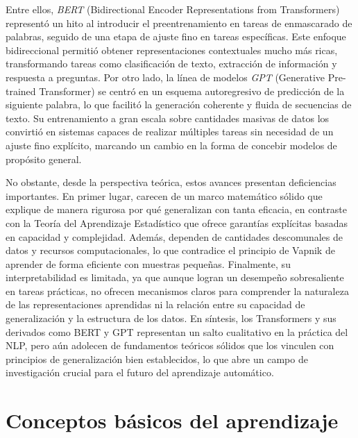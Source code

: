 \documentclass{report}
\begin{document}
Entre ellos, \textit{BERT} (Bidirectional Encoder Representations from Transformers) representó un hito al introducir el preentrenamiento en tareas de enmascarado de palabras, seguido de una etapa de ajuste fino en tareas específicas. Este enfoque bidireccional permitió obtener representaciones contextuales mucho más ricas, transformando tareas como clasificación de texto, extracción de información y respuesta a preguntas. Por otro lado, la línea de modelos \textit{GPT} (Generative Pre-trained Transformer) se centró en un esquema autoregresivo de predicción de la siguiente palabra, lo que facilitó la generación coherente y fluida de secuencias de texto. Su entrenamiento a gran escala sobre cantidades masivas de datos los convirtió en sistemas capaces de realizar múltiples tareas sin necesidad de un ajuste fino explícito, marcando un cambio en la forma de concebir modelos de propósito general.

No obstante, desde la perspectiva teórica, estos avances presentan deficiencias importantes. En primer lugar, carecen de un marco matemático sólido que explique de manera rigurosa por qué generalizan con tanta eficacia, en contraste con la Teoría del Aprendizaje Estadístico que ofrece garantías explícitas basadas en capacidad y complejidad. Además, dependen de cantidades descomunales de datos y recursos computacionales, lo que contradice el principio de Vapnik de aprender de forma eficiente con muestras pequeñas. Finalmente, su interpretabilidad es limitada, ya que aunque logran un desempeño sobresaliente en tareas prácticas, no ofrecen mecanismos claros para comprender la naturaleza de las representaciones aprendidas ni la relación entre su capacidad de generalización y la estructura de los datos.
En síntesis, los Transformers y sus derivados como BERT y GPT representan un salto cualitativo en la práctica del NLP, pero aún adolecen de fundamentos teóricos sólidos que los vinculen con principios de generalización bien establecidos, lo que abre un campo de investigación crucial para el futuro del aprendizaje automático.



\section{Conceptos básicos del aprendizaje}
\end{document}
